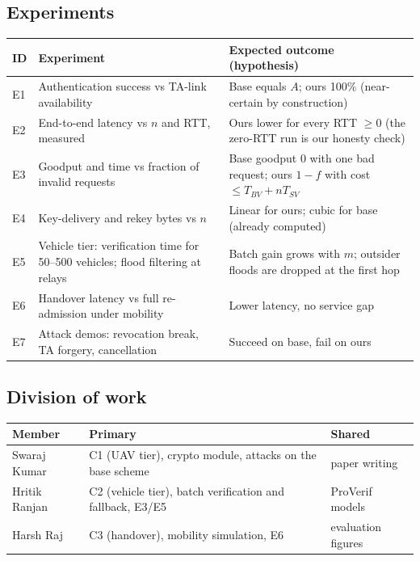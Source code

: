 \subsection{Experiments}
\begin{center}\small
\begin{tabularx}{\linewidth}{@{}l>{\raggedright\arraybackslash}X>{\raggedright\arraybackslash}X@{}}
\toprule
ID & Experiment & Expected outcome (hypothesis)\\
\midrule
E1 & Authentication success vs TA-link availability & Base equals $A$; ours 100\% (near-certain by construction)\\
E2 & End-to-end latency vs $n$ and RTT, measured & Ours lower for every RTT $\ge 0$ (the zero-RTT run is our honesty check)\\
E3 & Goodput and time vs fraction of invalid requests & Base goodput 0 with one bad request; ours $1-f$ with cost $\le T_{BV}+nT_{SV}$\\
E4 & Key-delivery and rekey bytes vs $n$ & Linear for ours; cubic for base (already computed)\\
E5 & Vehicle tier: verification time for 50--500 vehicles; flood filtering at relays & Batch gain grows with $m$; outsider floods are dropped at the first hop\\
E6 & Handover latency vs full re-admission under mobility & Lower latency, no service gap\\
E7 & Attack demos: revocation break, TA forgery, cancellation & Succeed on base, fail on ours\\
\bottomrule
\end{tabularx}
\end{center}

\subsection{Division of work}
\begin{center}\small
\begin{tabular}{@{}lll@{}}
\toprule
Member & Primary & Shared\\
\midrule
Swaraj Kumar & C1 (UAV tier), crypto module, attacks on the base scheme & paper writing\\
Hritik Ranjan & C2 (vehicle tier), batch verification and fallback, E3/E5 & ProVerif models\\
Harsh Raj & C3 (handover), mobility simulation, E6 & evaluation figures\\
\bottomrule
\end{tabular}
\end{center}

